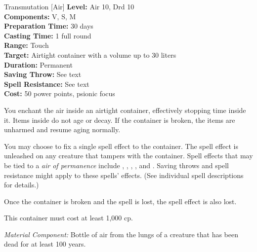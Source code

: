 {Transmutation [Air]}
{
    \textbf{Level:}
    Air 10, Drd 10\\
    \textbf{Components:}
    V, S, M\\
    \textbf{Preparation Time:}
    30 days\\
    \textbf{Casting Time:}
    1 full round\\
    \textbf{Range:}
    Touch\\
    \textbf{Target:}
    Airtight container with a volume up to 30 liters\\
    \textbf{Duration:}
    Permanent\\
    \textbf{Saving Throw:}
    See text\\
    \textbf{Spell Resistance:}
    See text\\
    \textbf{Cost:}
    50 power points, psionic focus\\
}
{
    You enchant the air inside an airtight container, effectively stopping time inside it. Items inside do not age or decay. If the container is broken, the items are unharmed and resume aging normally.

    You may choose to fix a single spell effect to the container. The spell effect is unleashed on any creature that tampers with the container. Spell effects that may be tied to a \emph{air of permanence} include , , , , and . Saving throws and spell resistance might apply to these spells' effects. (See individual spell descriptions for details.)

    Once the container is broken and the spell is lost, the spell effect is also lost.

    This container must cost at least 1,000 cp.

    \textit{Material Component:} Bottle of air from the lungs of a creature that has been dead for at least 100 years.
}
